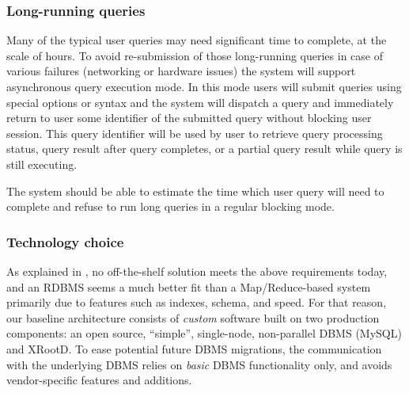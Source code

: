 \documentclass[DM,toc]{lsstdoc}
\begin{document}
\subsubsection{Long-running queries}\label{long-running-queries}

Many of the typical user queries may need significant time to complete,
at the scale of hours. To avoid re-submission of those long-running
queries in case of various failures (networking or hardware issues) the
system will support asynchronous query execution mode. In this mode
users will submit queries using special options or syntax and the system
will dispatch a query and immediately return to user some identifier of
the submitted query without blocking user session. This query identifier
will be used by user to retrieve query processing status, query result
after query completes, or a partial query result while query is still
executing.

The system should be able to estimate the time which user query will
need to complete and refuse to run long queries in a regular blocking
mode.

\subsubsection{Technology choice}\label{technology-choice}

As explained in , no off-the-shelf solution meets the above
requirements today, and an RDBMS seems a much better fit than a Map/Reduce-based
system primarily due to features such as indexes, schema, and speed. For
that reason, our baseline architecture consists of \emph{custom} software
built on two production components: an open source, ``simple'', single-node,
non-parallel DBMS (MySQL) and XRootD. To ease potential future DBMS
migrations, the communication with the underlying DBMS relies on \emph{basic}
DBMS functionality only, and avoids vendor-specific features and additions.
\end{document}
